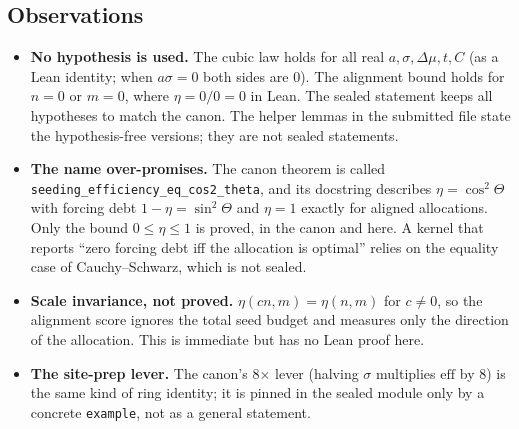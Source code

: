 \documentclass[11pt]{article}
\theoremstyle{definition}
\theoremstyle{remark}
\begin{document}
\subsection{Observations}
\begin{itemize}
\item \textbf{No hypothesis is used.} The cubic law holds for all real $a,\sigma,\Delta\mu,t,C$ (as a Lean identity; when
$a\sigma=0$ both sides are $0$). The alignment bound holds for $n=0$ or $m=0$, where $\eta=0/0=0$ in Lean.
The sealed statement keeps all hypotheses to match the canon. The helper lemmas in the submitted file state the
hypothesis-free versions; they are not sealed statements.
\item \textbf{The name over-promises.} The canon theorem is called \texttt{seeding\_efficiency\_eq\_cos2\_theta}, and its
docstring describes $\eta=\cos^2\Theta$ with forcing debt $1-\eta=\sin^2\Theta$ and $\eta=1$ exactly for aligned allocations.
Only the bound $0\le\eta\le1$ is proved, in the canon and here. A kernel that reports ``zero forcing debt iff the allocation
is optimal'' relies on the equality case of Cauchy--Schwarz, which is not sealed.
\item \textbf{Scale invariance, not proved.} $\eta(cn,m)=\eta(n,m)$ for $c\ne0$, so the alignment score ignores the total
seed budget and measures only the direction of the allocation. This is immediate but has no Lean proof here.
\item \textbf{The site-prep lever.} The canon's 8$\times$ lever (halving $\sigma$ multiplies $\mathrm{eff}$ by $8$) is the same
kind of ring identity; it is pinned in the sealed module only by a concrete \texttt{example}, not as a general statement.
\end{itemize}
\end{document}
